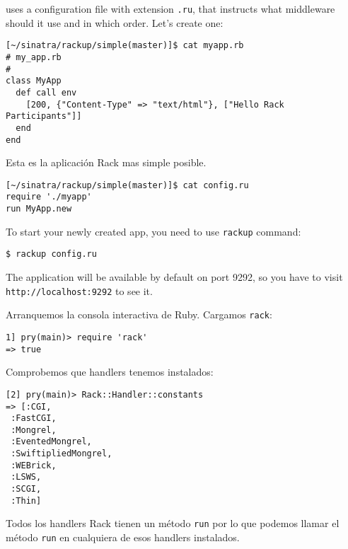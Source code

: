 
 uses a 
configuration file with extension 
\verb|.ru|, that instructs 
what middleware should it use and in which order. Let’s create one:

\begin{verbatim}
[~/sinatra/rackup/simple(master)]$ cat myapp.rb 
# my_app.rb
#
class MyApp
  def call env
    [200, {"Content-Type" => "text/html"}, ["Hello Rack Participants"]] 
  end
end
\end{verbatim}

Esta es la aplicación Rack mas simple posible.

\begin{verbatim}
[~/sinatra/rackup/simple(master)]$ cat config.ru
require './myapp'
run MyApp.new
\end{verbatim}
To start your newly created app, you need to use \verb|rackup| command:

\begin{verbatim}
$ rackup config.ru 
\end{verbatim}
The application will be available by default on port 9292, 
so you have to visit \verb|http://localhost:9292| to see it. 


Arranquemos la consola interactiva de Ruby. Cargamos \verb|rack|:

\begin{verbatim}
1] pry(main)> require 'rack'
=> true
\end{verbatim}
Comprobemos que handlers tenemos instalados:
\begin{verbatim}
[2] pry(main)> Rack::Handler::constants
=> [:CGI,
 :FastCGI,
 :Mongrel,
 :EventedMongrel,
 :SwiftipliedMongrel,
 :WEBrick,
 :LSWS,
 :SCGI,
 :Thin]
\end{verbatim}

Todos los handlers Rack tienen un método \verb|run| por lo que podemos 
llamar el método \verb|run| en cualquiera de esos handlers instalados.

